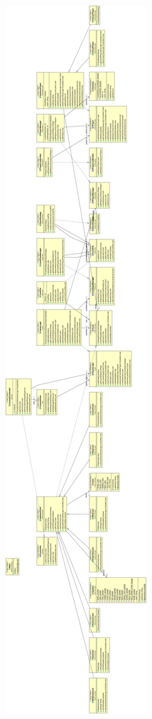\documentclass[letterpaper,11pt]{article}
\begin{document}
\begin{figure}[H]
\center
\includegraphics[scale=0.13]{UMLTarea2foto.png}
\end{figure}

\end{document}
